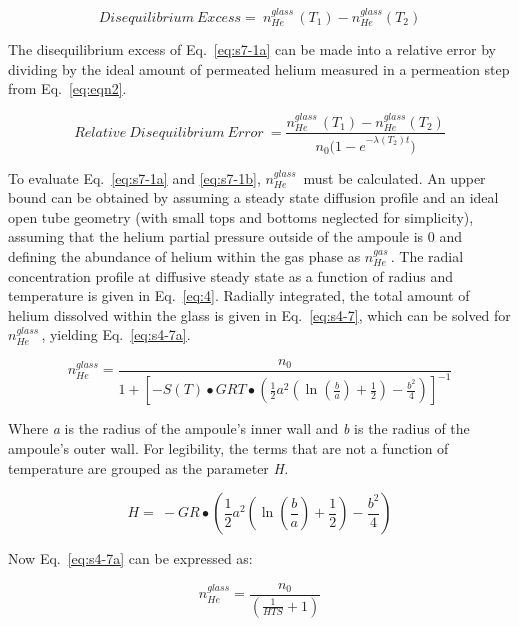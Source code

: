 \begin{equation}
Disequilibrium\ Excess = \ n_{He}^{glass\ }\left( T_{1} \right) - n_{He}^{glass}\left( T_{2} \right)
\label{eq:s7-1a}
\end{equation}

The disequilibrium excess of Eq.~\eqref{eq:s7-1a} can be made into a relative
error by dividing by the ideal amount of permeated helium measured in a
permeation step from Eq.~\eqref{eq:eqn2}.

\begin{equation}
Relative\ Disequilibrium\ Error\  = \frac{n_{He}^{glass\ }\left( T_{1} \right) - n_{He}^{glass}\left( T_{2} \right)}{n_{0}{(1 - e}^{- \lambda(T_{2})t})}
\label{eq:s7-1b}
\end{equation}

To evaluate Eq.~\eqref{eq:s7-1a} and \eqref{eq:s7-1b}, \(n_{He}^{glass\ }\) must be
calculated. An upper bound can be obtained by assuming a steady state
diffusion profile and an ideal open tube geometry (with small tops and
bottoms neglected for simplicity), assuming that the helium partial
pressure outside of the ampoule is 0 and defining the abundance of
helium within the gas phase as \(n_{He}^{gas\ }.\) The radial
concentration profile at diffusive steady state as a function of radius
and temperature is given in Eq.~\eqref{eq:4}. Radially integrated, the total
amount of helium dissolved within the glass is given in
Eq.~\eqref{eq:s4-7}, which
can be solved for \(n_{He}^{glass\ }\), yielding Eq.~\eqref{eq:s4-7a}.

\begin{equation}
n_{He}^{glass} = \frac{n_{0}}{1 + \left\lbrack - S(T) \bullet GRT \bullet \left( \frac{1}{2}a^{2}\left( \ln\left( \frac{b}{a} \right) + \frac{1}{2} \right) - \frac{b^{2}}{4} \right) \right\rbrack^{- 1}}
\label{eq:s4-7a}
\end{equation}

Where \emph{a} is the radius of the ampoule's inner wall and \emph{b} is
the radius of the ampoule's outer wall. For legibility, the terms that
are not a function of temperature are grouped as the parameter \emph{H.}

\[H = \  - GR \bullet \left( \frac{1}{2}a^{2}\left( \ln\left( \frac{b}{a} \right) + \frac{1}{2} \right) - \frac{b^{2}}{4} \right)\]

Now Eq.~\eqref{eq:s4-7a} can be expressed as:

\[
n_{He}^{glass} = \frac{n_{0}}{\left( \frac{1}{HTS} + 1 \right)}
\]

